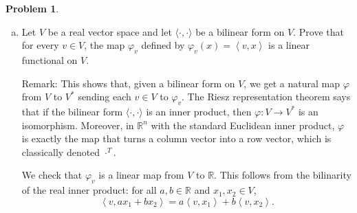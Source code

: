 \documentclass[11pt,oneside]{amsart}
\theoremstyle{definition}
\newtheorem{problem}{Problem}
\newcommand{\bR}{\mathbb{R}}
\newcommand{\innerprod}[1]{\left\langle#1\right\rangle}
\begin{document}
    \begin{problem}
        \leavevmode\begin{enumerate}[(a)]
            \item Let $V$ be a real vector space and let $\langle\cdot,\cdot\rangle$ be a bilinear form on $V$. Prove that for every $v\in V$, the map $\varphi_{v}$ defined by $\varphi_v(x)=\innerprod{v,x}$ is a linear functional on $V$.
            
            Remark: This shows that, given a bilinear form on $V$, we get a natural map $\varphi$ from $V$ to $V^*$ sending each $v\in V$ to $\varphi_v$. The Riesz representation theorem says that if the bilinear form $\langle\cdot,\cdot\rangle$ is an inner product, then $\varphi\colon V\to V^*$ is an isomorphism. Moreover, in $\bR^n$ with the standard Euclidean inner product, $\varphi$ is exactly the map that turns a column vector into a row vector, which is classically denoted $\cdot^T$.
            \begin{solution}
                We check that $\varphi_v$ is a linear map from $V$ to $\bR$. This follows from the bilinarity of the real inner product: for all $a,b\in \bR$ and $x_1,x_2\in V$,
                \[\innerprod{v,ax_1+bx_2}=a\innerprod{v,x_1}+b\innerprod{v,x_2}.\]
            \end{solution}
            

\end{enumerate}
\end{problem}
\end{document}
